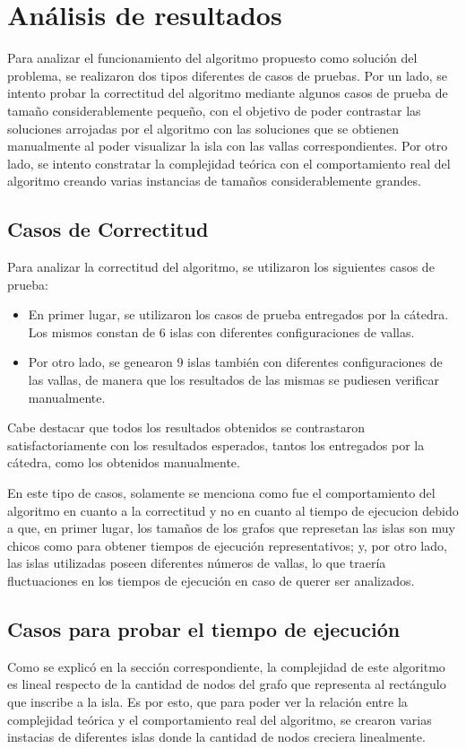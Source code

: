 \documentclass[a4paper, 12pt]{article}
\begin{document}
\section*{An\'alisis de resultados}
Para analizar el funcionamiento del algoritmo propuesto como soluci\'on del problema, se realizaron dos tipos diferentes de casos de pruebas. Por un lado, se intento probar la correctitud del algoritmo mediante algunos casos de prueba de tama\~{n}o considerablemente peque\~{n}o, con el objetivo de poder contrastar las soluciones arrojadas por el algoritmo con las soluciones que se obtienen manualmente al poder visualizar la isla con las vallas correspondientes. Por otro lado, se intento constratar la complejidad te\'orica con el comportamiento real del algoritmo creando varias instancias de tama\~{n}os considerablemente grandes.

\subsection*{Casos de Correctitud}
Para analizar la correctitud del algoritmo, se utilizaron los siguientes casos de prueba:
\begin{itemize}
\item En primer lugar, se utilizaron los casos de prueba entregados por la c\'atedra. Los mismos constan de 6 islas con diferentes configuraciones de vallas.
\item Por otro lado, se genearon 9 islas tambi\'en con diferentes configuraciones de las vallas, de manera que los resultados de las mismas se pudiesen verificar manualmente.
\end{itemize}

Cabe destacar que todos los resultados obtenidos se contrastaron satisfactoriamente con los resultados esperados, tantos los entregados por la c\'atedra, como los obtenidos manualmente.

En este tipo de casos, solamente se menciona como fue el comportamiento del algoritmo en cuanto a la correctitud y no en cuanto al tiempo de ejecucion debido a que, en primer lugar, los tama\~{n}os de los grafos que represetan las islas son muy chicos como para obtener tiempos de ejecuci\'on representativos; y, por otro lado, las islas utilizadas poseen diferentes n\'umeros de vallas, lo que traer\'ia fluctuaciones en los tiempos de ejecuci\'on en caso de querer ser analizados.

\subsection*{Casos para probar el tiempo de ejecuci\'on}
Como se explic\'o en la secci\'on correspondiente, la complejidad de este algoritmo es lineal respecto de la cantidad de nodos del grafo que representa al rect\'angulo que inscribe a la isla. Es por esto, que para poder ver la relaci\'on entre la complejidad te\'orica y el comportamiento real del algoritmo, se crearon varias instacias de diferentes islas donde la cantidad de nodos creciera linealmente.
\end{document}
